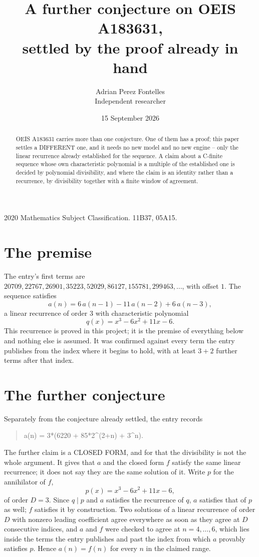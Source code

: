 \documentclass[11pt,a4paper]{article}
\title{A further conjecture on OEIS A183631,\\ \large settled by the proof already in hand}
\author{Adrian Perez Fontelles\\ \small Independent researcher}
\date{15 September 2026}
\theoremstyle{plain}
\theoremstyle{definition}
\begin{document}
\maketitle

\begin{abstract}
OEIS A183631 carries more than one conjecture. One of them has a proof; this paper settles a
DIFFERENT one, and it needs no new model and no new engine -- only the linear recurrence already
established for the sequence. A claim about a C-finite sequence whose own characteristic
polynomial is a multiple of the established one is decided by polynomial divisibility, and where
the claim is an identity rather than a recurrence, by divisibility together with a finite window
of agreement.
\end{abstract}

\noindent\small 2020 Mathematics Subject Classification. 11B37, 05A15.\normalsize

\section{The premise}

The entry's first terms are $20709, 22767, 26901, 35223, 52029, 86127, 155781, 299463,\dots$, with offset $1$. The sequence satisfies
\[
  a(n)=6\,a(n-1) - 11\,a(n-2) + 6\,a(n-3) ,
\]
a linear recurrence of order $3$ with characteristic polynomial
\[
  q(x)=x^{3} - 6 x^{2} + 11 x - 6 .
\]
This recurrence is proved in this project; it is the premise of everything below and nothing else is assumed.
It was confirmed against every term the entry publishes from the index where it begins to hold,
with at least $3+2$ further terms after that index.

\section{The further conjecture}

Separately from the conjecture already settled, the entry records

\begin{quote}\raggedright a(n) = 3*(6220 + 85*2\^{}(2+n) + 3\^{}n).\end{quote}

The further claim is a CLOSED FORM, and for that the divisibility is not the whole argument. It
gives that $a$ and the closed form $f$ satisfy the same linear recurrence; it does not say they
are the same solution of it. Write $p$ for the annihilator of $f$,
\[
  p(x)=x^{3} - 6 x^{2} + 11 x - 6 ,
\]
of order $D=3$. Since $q\mid p$ and $a$ satisfies the recurrence of $q$, $a$ satisfies that of
$p$ as well; $f$ satisfies it by construction. Two solutions of a linear recurrence of order $D$
with nonzero leading coefficient agree everywhere as soon as they agree at $D$ consecutive
indices, and $a$ and $f$ were checked to agree at $n=4,\dots,6$,
which lies inside the terms the entry publishes and past the index from which $a$ provably
satisfies $p$. Hence $a(n)=f(n)$ for every $n$ in the claimed range.
\end{document}
